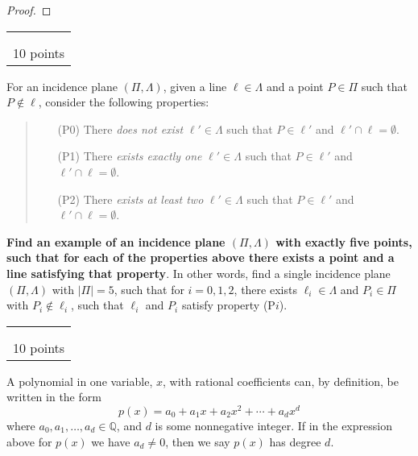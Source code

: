 \documentclass[addpoints]{exam}[14pt]
\newcounter{prb_num}
\newcounter{prb_num_a}
\newcommand{\prbbox}[1]
{
\stepcounter{prb_num}
\setcounter{prb_num_a}{0}
\vfill 
\begin{flushright}
\begin{tabular}{|l|} \hline 
\arabic{prb_num} \hskip .2in \ \\  \\ \hline
 #1\textnormal{  points}  \\
 \hline   \end{tabular} 
\end{flushright}
\newpage 
}
\begin{document}
\begin{questions}
\begin{proof}
\end{proof}



\prbbox{10}



\question[10]
For an incidence plane $(\Pi,\Lambda)$, given a line $\ell\in \Lambda$ and a point $P\in \Pi$ such that $P\notin\ell$, consider the following properties:

\begin{quote}


\begin{enumerate}
\item[(P0)] There \emph{does not exist} $\ell'\in \Lambda$ such that $P\in \ell'$ and $\ell'\cap \ell = \emptyset$.

\item[(P1)] There \emph{exists exactly one} $\ell'\in \Lambda$ such that $P\in \ell'$ and $\ell'\cap \ell = \emptyset$.

\item[(P2)] There \emph{exists at least two}  $\ell'\in \Lambda$ such that $P\in \ell'$ and $\ell'\cap \ell = \emptyset$.

\end{enumerate}

\end{quote}


\textbf{Find an example of an incidence plane  $(\Pi,\Lambda)$ with exactly five points, such that for each of the properties above there exists a point and a line satisfying that property}.  In other words,  find a single   incidence plane $(\Pi,\Lambda)$ with $|\Pi|=5$, such that for $i=0,1,2$, there exists  $\ell_i\in \Lambda$  and $P_i\in \Pi$ with $P_i\notin \ell_i$, such that  $\ell_i$ and $P_i$ satisfy property (P$i$).







\prbbox{10}








\question
A polynomial in one variable, $x$,  with rational coefficients can, by definition, be written in the form
$$
p(x)= a_0+a_1x+a_2x^2+\cdots + a_dx^d
$$
where $a_0,a_1,\dots,a_d\in \mathbb Q$, and $d$ is some nonnegative integer.  If in the expression above for $p(x)$ we have $a_d\ne 0$, then we say $p(x)$ has degree $d$.  


\end{questions}
\end{document}
